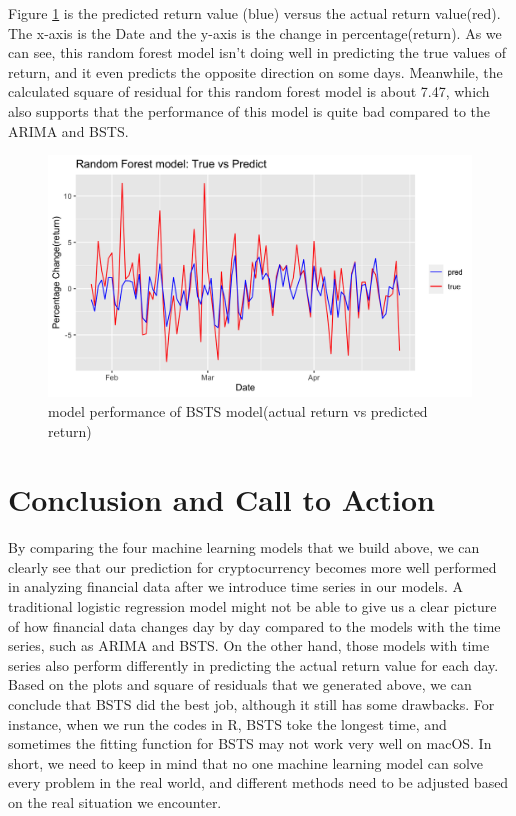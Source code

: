 \documentclass{article}
\begin{document}
\noindent Figure \ref{fig: rf1_true_and_predict} is the predicted return value (blue) versus the actual return value(red). The x-axis is the Date and the y-axis is the change in percentage(return). As we can see, this random forest model isn't doing well in predicting the true values of return, and it even predicts the opposite direction on some days. Meanwhile, the calculated square of residual for this random forest model is about 7.47, which also supports that the performance of this model is quite bad compared to the ARIMA and BSTS. 

\begin{figure}[H]
	\centering
	\includegraphics[width=16cm]{../figures/rf1_true_and_predict.png}
	\caption{model performance of BSTS model(actual return vs predicted return)}
	\label{fig: rf1_true_and_predict}
\end{figure}

\section{Conclusion and Call to Action}

By comparing the four machine learning models that we build above, we can clearly see that our prediction for cryptocurrency becomes more well performed in analyzing financial data after we introduce time series in our models. A traditional logistic regression model might not be able to give us a clear picture of how financial data changes day by day compared to the models with the time series, such as ARIMA and BSTS. On the other hand, those models with time series also perform differently in predicting the actual return value for each day. Based on the plots and square of residuals that we generated above, we can conclude that BSTS did the best job, although it still has some drawbacks. For instance, when we run the codes in R, BSTS toke the longest time, and sometimes the fitting function for BSTS  may not work very well on macOS. In short, we need to keep in mind that no one machine learning model can solve every problem in the real world, and different methods need to be adjusted based on the real situation we encounter. 
\end{document}

